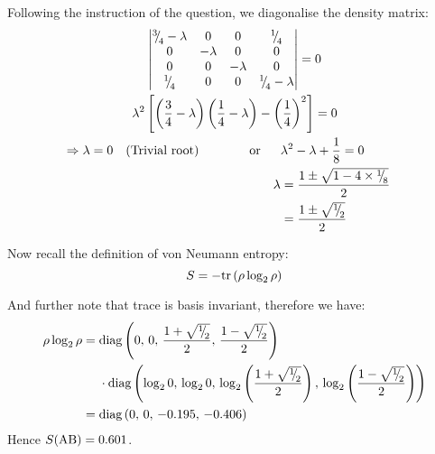 \begin{parts}
	Following the instruction of the question, we diagonalise the density matrix:
	\begin{gather*}
		\begin{vmatrix}
			\diagfrac{3}{4}-\lambda & 0 & 0 & \diagfrac{1}{4} \\
			0 & -\lambda & 0 & 0 \\
			0 & 0 & -\lambda & 0 \\
			\diagfrac{1}{4} & 0 & 0 & \diagfrac{1}{4}-\lambda
		\end{vmatrix} = 0 \\
		\lambda^2 \left[\left(\frac{3}{4} - \lambda\right)\left(\frac{1}{4} - \lambda\right) - \left(\frac{1}{4}\right)^2\right] = 0 \\
		\begin{align*}
			\Rightarrow \lambda = 0 \textnormal{\hspace{1em}(Trivial root)} &
			\textnormal{\hspace{4em}or}&&\lambda^2 - \lambda + \frac{1}{8} = 0 && \\
			&&\lambda &= \frac{1 \pm \sqrt{1 - 4\times\diagfrac{1}{8}}}{2} && \\
			&& &= \frac{1 \pm \sqrt{\diagfrac{1}{2}}}{2} &&
		\end{align*}
	\end{gather*}
	
	Now recall the definition of von Neumann entropy:
	\begin{equation*}
		S = -\textnormal{tr}\left(\rho\log_2 \rho\right)
	\end{equation*}
	
	And further note that trace is basis invariant, therefore we have:
	\begin{align*}
		\rho\log_2 \rho &=
		\begin{aligned}[t]
			&\textnormal{diag}\left(0,\, 0,\, \frac{1+\sqrt{{{}^{1}{\mskip -5mu/\mskip -3mu}_{2}}}}{2},\, \frac{1-\sqrt{{{}^{1}{\mskip -5mu/\mskip -3mu}_{2}}}}{2}\right) \\
			&\cdot \textnormal{diag}\left(\log_2 0,\, \log_2 0,\, \log_2 \left(\frac{1+\sqrt{{{}^{1}{\mskip -5mu/\mskip -3mu}_{2}}}}{2}\right),\, \log_2 \left(\frac{1-\sqrt{{{}^{1}{\mskip -5mu/\mskip -3mu}_{2}}}}{2}\right)\right)
		\end{aligned} \\
		&= \textnormal{diag}\left(0,\, 0,\, -0.195,\, -0.406\right)
	\end{align*}
	Hence $S(\textnormal{AB}) = 0.601$.
	

\end{parts}
